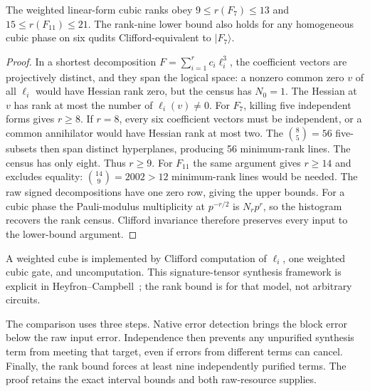 \begin{lemma}\label{lem:waring}
The weighted linear-form cubic ranks obey
$9\leq r(F_7)\leq13$ and $15\leq r(F_{11})\leq21$.
The rank-nine lower bound also holds for any homogeneous cubic phase on six
qudits Clifford-equivalent to $|F_7\rangle$.
\end{lemma}
\begin{proof}
In a shortest decomposition $F=\sum_{i=1}^r c_i\ell_i^3$, the coefficient
vectors are projectively distinct, and they span the logical space: a nonzero
common zero $v$ of all $\ell_i$ would have Hessian rank zero, but the census
has $N_0=1$.
The Hessian at $v$ has rank at most the number of $\ell_i(v)\ne0$.
For $F_7$, killing five independent forms gives $r\geq8$.
If $r=8$, every six coefficient vectors must be independent, or a common
annihilator would have Hessian rank at most two. The $\binom85=56$
five-subsets then span distinct hyperplanes, producing 56 minimum-rank lines.
The census has only eight. Thus $r\geq9$.
For $F_{11}$ the same argument gives $r\geq14$ and excludes equality:
$\binom{14}9=2002>12$ minimum-rank lines would be needed.
The raw signed decompositions have one zero row, giving the upper bounds.
For a cubic phase the Pauli-modulus multiplicity at $p^{-r/2}$ is $N_rp^r$,
so the histogram recovers the rank census. Clifford invariance therefore
preserves every input to the lower-bound argument.
\end{proof}
A weighted cube is implemented by Clifford computation of $\ell_i$, one
weighted cubic gate, and uncomputation. This signature-tensor synthesis
framework is explicit in Heyfron--Campbell~\cite[Section IV]{heyfron};
the rank bound is for that model, not arbitrary circuits.


The comparison uses three steps. Native error detection brings the block error
below the raw input error. Independence then prevents any unpurified synthesis
term from meeting that target, even if errors from different terms can cancel.
Finally, the rank bound forces at least nine independently purified terms.
The proof retains the exact interval bounds and both raw-resource supplies.

